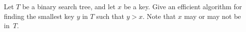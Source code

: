 Let $T$ be a binary search tree, and let $x$ be a key.   Give an
efficient algorithm for finding the smallest key $y$ in $T$ such that
$y > x$.  Note that $x$ may or may not be in~$T$.

